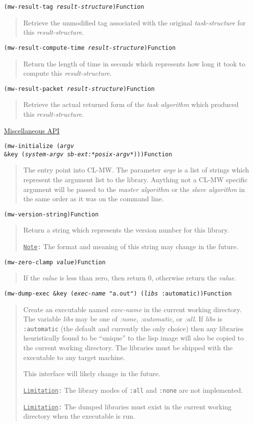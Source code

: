 \documentclass[titlepage,12pt]{book}
\newcommand{\xsmall}{\latexhtml{\small}{}}
\newcommand{\xnormalsize}{\latexhtml{\normalsize}{}}
\newcommand{\clmw}{\xsmall\textsc{CL-MW}\xnormalsize\xspace}
\newcommand{\sa}{\textit{slave algorithm}\xspace}
\newcommand{\ma}{\textit{master algorithm}\xspace}
\newcommand{\ta}{\textit{task algorithm}\xspace}
\newcommand{\Note}{\texttt{\underline{Note}:}\xspace}
\newcommand{\Limitation}{\texttt{\underline{Limitation}:}\xspace}
\newcommand{\apiheader}[1]{\begin{center}\underline{#1}\end{center}}
\newcommand{\apifunc}[2]{\noindent\xsmall\texttt{(#1)}\hspace*{\fill}\xnormalsize\texttt{#2}}
\newenvironment{apientry}[2]
	{\apifunc{#1}{#2}\begin{quotation}}
	{\end{quotation}}
\begin{document}
\begin{apientry}
{mw-result-tag \emph{result-structure}}
{Function}
Retrieve the unmodified tag associated with the original \emph{task-structure}
for this \emph{result-structure}.
\end{apientry}

\begin{apientry}
{mw-result-compute-time \emph{result-structure}}
{Function}
Return the length of time in seconds which represents how long it took to
compute this \emph{result-structure}.
\end{apientry}

\begin{apientry}
{mw-result-packet \emph{result-structure}}
{Function}
Retrieve the actual returned form of the \ta which produced this 
\emph{result-structure}.
\end{apientry}

\apiheader{Miscellaneous API}
\begin{apientry}
{mw-initialize (\emph{argv}\\
\indent \&key (\emph{system-argv} \emph{sb-ext:*posix-argv*}))}
{Function}
The entry point into \clmw. The parameter \emph{argv} is a list of
strings which represent the argument list to the library. Anything
not a \clmw specific argument will be passed to the \ma or the \sa
in the same order as it was on the command line.
\end{apientry}

\begin{apientry}
{mw-version-string}
{Function}
Return a string which represents the version number for this library.

\Note The format and meaning of this string may change in the future.
\end{apientry}

\begin{apientry}
{mw-zero-clamp \emph{value}}
{Function}
If the \emph{value} is less than zero, then return 0, otherwise return the
\emph{value}.
\end{apientry}

\begin{apientry}
{mw-dump-exec \&key (\emph{exec-name} "a.out") (\emph{libs} :automatic)}
{Function}
Create an executable named \emph{exec-name} in the current
working directory.  The variable \emph{libs} may be one of
\emph{:none}, \emph{:automatic}, or \emph{:all}. If \emph{libs} is
\texttt{:automatic} (the default and currently the only choice) then
any libraries heuristically found to be ``unique'' to the lisp image
will also be copied to the current working directory. The libraries
must be shipped with the executable to any target machine.

This interface will likely change in the future.

\Limitation The library modes of \texttt{:all} and \texttt{:none} are not
	implemented.

\Limitation The dumped libraries must exist in the current working directory
	when the executable is run.
\end{apientry}
\end{document}
